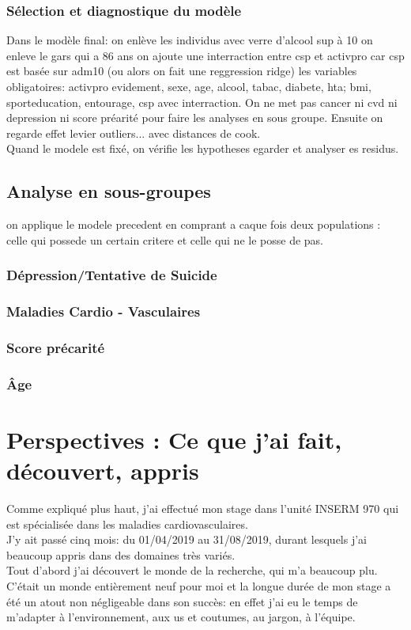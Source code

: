 \documentclass{book}
\begin{document}
\subsubsection{Sélection et diagnostique du modèle}
Dans le modèle final: on enlève les individus avec verre d'alcool sup à 10 on enleve le gars qui a 86 ans on ajoute une interraction entre csp et activpro car csp est basée sur adm10 (ou alors on fait une reggression ridge)
les variables obligatoires: activpro evidement, sexe, age, alcool, tabac, diabete, hta; bmi, sporteducation, entourage, csp avec interraction. On ne met pas cancer ni cvd ni depression ni score préarité pour faire les analyses en sous groupe.
Ensuite on regarde effet levier outliers... avec distances de cook.\\

Quand le modele est fixé, on vérifie les hypotheses egarder et analyser es residus.
\subsection{Analyse en sous-groupes}
on applique le modele precedent en comprant a caque fois deux populations : celle qui possede un certain critere et celle qui ne le posse de pas.
\subsubsection{Dépression/Tentative de Suicide}
\subsubsection{Maladies Cardio - Vasculaires}
\subsubsection{Score précarité}
\subsubsection{Âge}

\newpage
\section{Perspectives : Ce que j'ai fait, découvert, appris}

Comme expliqué plus haut, j'ai effectué mon stage dans l'unité INSERM 970 qui est spécialisée dans les maladies cardiovasculaires.\\
J'y ait passé cinq mois: du 01/04/2019 au 31/08/2019, durant lesquels j'ai beaucoup appris dans des domaines très variés.\\
Tout d'abord j'ai découvert le monde de la recherche, qui m'a beaucoup plu. C'était un monde entièrement neuf pour moi et la longue durée de mon stage a été un atout non négligeable dans son succès: en effet j'ai eu le temps de m'adapter à l'environnement, aux us et coutumes, au jargon, à l'équipe.\\
\end{document}
